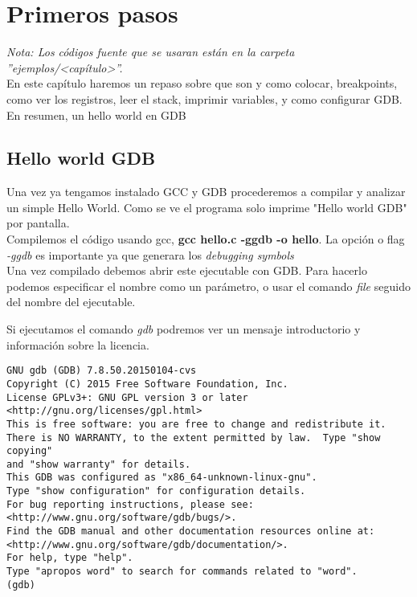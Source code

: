 \section{Primeros pasos}
\emph{Nota: Los códigos fuente que se usaran están en la carpeta ''ejemplos/<capítulo>''. }\\
En este capítulo haremos un repaso sobre que son y como colocar, breakpoints, como ver los registros, leer el stack, imprimir variables, y como configurar GDB. En resumen, un hello world en GDB


\subsection{Hello world GDB}
Una vez ya tengamos instalado GCC y GDB procederemos a compilar y analizar un simple Hello World. 
Como se ve el programa solo imprime "Hello world GDB" por pantalla. \\
Compilemos el código usando gcc, \textbf{gcc hello.c -ggdb -o hello}. La opción o flag \emph{-ggdb} es importante ya que generara los \emph{debugging symbols}\\
Una vez compilado debemos abrir este ejecutable con GDB. Para hacerlo podemos especificar el nombre como un parámetro, o usar el comando \emph{file} seguido del nombre del ejecutable. 

Si ejecutamos el comando \emph{gdb} podremos ver un mensaje introductorio y información sobre la licencia. 
\begin{verbatim}
GNU gdb (GDB) 7.8.50.20150104-cvs
Copyright (C) 2015 Free Software Foundation, Inc.
License GPLv3+: GNU GPL version 3 or later <http://gnu.org/licenses/gpl.html>
This is free software: you are free to change and redistribute it.
There is NO WARRANTY, to the extent permitted by law.  Type "show copying"
and "show warranty" for details.
This GDB was configured as "x86_64-unknown-linux-gnu".
Type "show configuration" for configuration details.
For bug reporting instructions, please see:
<http://www.gnu.org/software/gdb/bugs/>.
Find the GDB manual and other documentation resources online at:
<http://www.gnu.org/software/gdb/documentation/>.
For help, type "help".
Type "apropos word" to search for commands related to "word".
(gdb) 
\end{verbatim}

